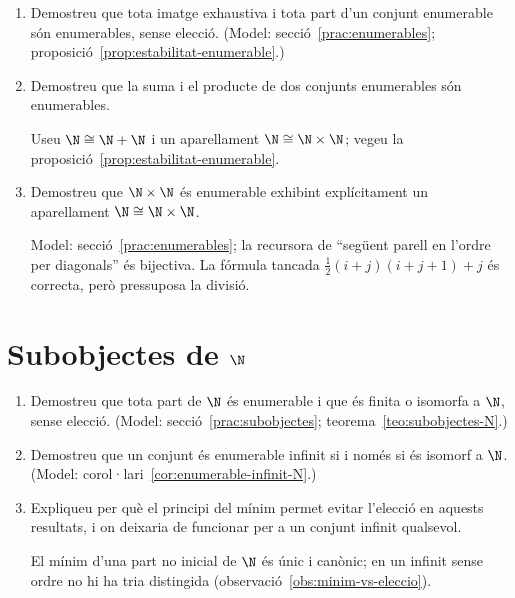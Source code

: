 \begin{enumerate}[resume]
  \item Demostreu que tota imatge exhaustiva i tota part d'un conjunt enumerable són enumerables, sense elecció. (Model: secció~\ref{prac:enumerables}; proposició~\ref{prop:estabilitat-enumerable}.)

  \item Demostreu que la suma i el producte de dos conjunts enumerables són enumerables. \begin{indicacio}Useu \(\N\cong\N+\N\) i un aparellament \(\N\cong\N\times\N\); vegeu la proposició~\ref{prop:estabilitat-enumerable}.\end{indicacio}

  \item Demostreu que \(\N\times\N\) és enumerable exhibint explícitament un aparellament \(\N\cong\N\times\N\). \begin{indicacio}Model: secció~\ref{prac:enumerables}; la recursora de \enquote{següent parell en l'ordre per diagonals} és bijectiva. La fórmula tancada \(\tfrac12(i+j)(i+j+1)+j\) és correcta, però pressuposa la divisió.\end{indicacio}
\end{enumerate}

\section{Subobjectes de \texorpdfstring{\(\N\)}{N}}

\begin{enumerate}[resume]
  \item Demostreu que tota part de \(\N\) és enumerable i que és finita o isomorfa a \(\N\), sense elecció. (Model: secció~\ref{prac:subobjectes}; teorema~\ref{teo:subobjectes-N}.)

  \item Demostreu que un conjunt és enumerable infinit si i només si és isomorf a \(\N\). (Model: corol·lari~\ref{cor:enumerable-infinit-N}.)

  \item Expliqueu per què el principi del mínim permet evitar l'elecció en aquests resultats, i on deixaria de funcionar per a un conjunt infinit qualsevol. \begin{indicacio}El mínim d'una part no inicial de \(\N\) és únic i canònic; en un infinit sense ordre no hi ha tria distingida (observació~\ref{obs:minim-vs-eleccio}).\end{indicacio}
\end{enumerate}


